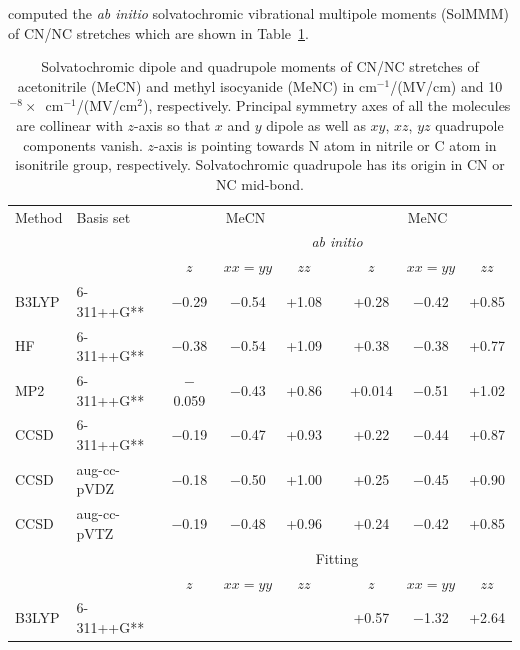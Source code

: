 \documentclass[b5paper,oneside,fleqn,11pt]{book}
\begin{document}
\begin{refsection}
computed the \emph{ab initio} solvatochromic vibrational multipole moments (SolMMM) 
of CN/NC stretches which are shown in Table~\ref{t:cnnc-solcamm}.
%
\begin{table}
\caption{Solvatochromic dipole and quadrupole moments of CN/NC stretches of
acetonitrile (MeCN) and methyl isocyanide (MeNC) in cm$^{-1}$/(MV/cm) and 10$^{-8}\times$\
cm$^{-1}$/(MV/cm$^2$), respectively. Principal symmetry axes of all the molecules are collinear with 
$z$-axis so that $x$ and $y$ dipole as well as $xy$, $xz$, $yz$ quadrupole components vanish. 
$z$-axis is 
pointing towards N atom in nitrile or C atom in isonitrile group, respectively. Solvatochromic 
quadrupole has its origin in CN or NC mid\hyp{}bond.
\label{t:cnnc-solcamm}}
\begin{tabular*}{1.0\textwidth}{@{\extracolsep{\fill} } ll ccc c ccc}
\hline\hline
Method & Basis set    & \multicolumn{3}{c}{MeCN} && \multicolumn{3}{c}{MeNC}                 \\
       &              & \multicolumn{7}{c}{\emph{ab initio}}                                 \\
       &              & $z$     &  $xx=yy$  & $zz$     &&    $z$    &  $xx=yy$    &    $zz$  \\
\cline{3-5} \cline{7-9}
B3LYP  & 6-311++G**   & $-$0.29  &  $-$0.54   &  +1.08   &&   +0.28   &   $-$0.42    &   +0.85  \\
HF     & 6-311++G**   & $-$0.38  &  $-$0.54   &  +1.09   &&   +0.38   &   $-$0.38    &   +0.77  \\
MP2    & 6-311++G**   & $-$0.059 &  $-$0.43   &  +0.86   &&   +0.014  &   $-$0.51    &   +1.02  \\
CCSD   & 6-311++G**   & $-$0.19  &  $-$0.47   &  +0.93   &&   +0.22   &   $-$0.44    &   +0.87  \\
CCSD   & aug-cc-pVDZ  & $-$0.18  &  $-$0.50   &  +1.00   &&   +0.25   &   $-$0.45    &   +0.90  \\
CCSD   & aug-cc-pVTZ  & $-$0.19  &  $-$0.48   &  +0.96   &&   +0.24   &   $-$0.42    &   +0.85  \\
       &              & \multicolumn{7}{c}{Fitting}                                             \\
       &              & $z$      &  $xx=yy$   & $zz$     &&    $z$    &  $xx=yy$     &    $zz$  \\
\cline{3-5} \cline{7-9}
B3LYP  & 6-311++G** 
                      &          &            &          &&   +0.57   &   $-$1.32    &   +2.64  \\

\end{tabular*}
\end{table}
\end{refsection}
\end{document}
